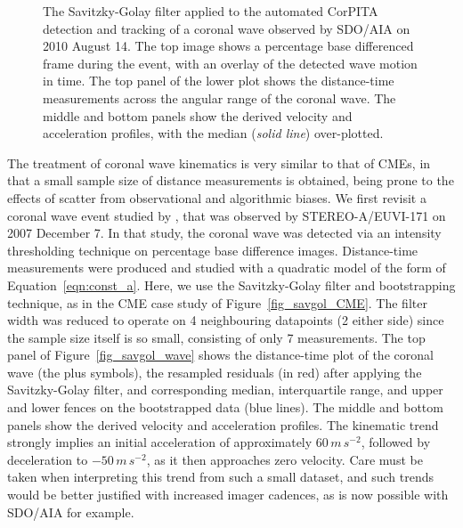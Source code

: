\documentclass[structabstract]{aa}
\begin{document}
\begin{figure}[!t]
\caption{The Savitzky-Golay filter applied to the automated CorPITA detection and tracking of a coronal wave observed by SDO/AIA on 2010 August 14. The top image shows a percentage base differenced frame during the event, with an overlay of the detected wave motion in time. The top panel of the lower plot shows the distance-time measurements across the angular range of the coronal wave. The middle and bottom panels show the derived velocity and acceleration profiles, with the median (\emph{solid line}) over-plotted.}
\label{fig_savgol_wave_CorPITA}
\end{figure}

The treatment of coronal wave kinematics is very similar to that of CMEs, in that a small sample size of distance measurements is obtained, being prone to the effects of scatter from observational and algorithmic biases. We first revisit a coronal wave event studied by \citet{2011A&A...531A..42L}, that was observed by STEREO-A/EUVI-171 on 2007 December 7. In that study, the coronal wave was detected via an intensity thresholding technique on percentage base difference images. Distance-time measurements were produced and studied with a quadratic model of the form of Equation~\ref{eqn:const_a}. Here, we use the Savitzky-Golay filter and bootstrapping technique, as in the CME case study of Figure~\ref{fig_savgol_CME}. The filter width was reduced to operate on 4 neighbouring datapoints (2 either side) since the sample size itself is so small, consisting of only 7 measurements. The top panel of Figure~\ref{fig_savgol_wave} shows the distance-time plot of the coronal wave (the plus symbols), the resampled residuals (in red) after applying the Savitzky-Golay filter, and corresponding median, interquartile range, and upper and lower fences on the bootstrapped data (blue lines). The middle and bottom panels show the derived velocity and acceleration profiles. The kinematic trend strongly implies an initial acceleration of approximately $60\,m\,s^{-2}$, followed by deceleration to $-50\,m\,s^{-2}$, as it then approaches zero velocity. Care must be taken when interpreting this trend from such a small dataset, and such trends would be better justified with increased imager cadences, as is now possible with SDO/AIA for example.
\end{document}

